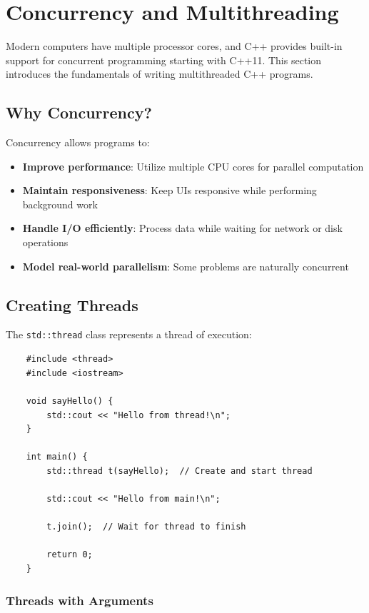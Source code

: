 \section{Concurrency and Multithreading}

Modern computers have multiple processor cores, and C++ provides built-in support for concurrent programming starting with C++11. This section introduces the fundamentals of writing multithreaded C++ programs.

\subsection{Why Concurrency?}

Concurrency allows programs to:
\begin{itemize}
	\item \textbf{Improve performance}: Utilize multiple CPU cores for parallel computation
	\item \textbf{Maintain responsiveness}: Keep UIs responsive while performing background work
	\item \textbf{Handle I/O efficiently}: Process data while waiting for network or disk operations
	\item \textbf{Model real-world parallelism}: Some problems are naturally concurrent
\end{itemize}

\subsection{Creating Threads}

The \texttt{std::thread} class represents a thread of execution:

\begin{lstlisting}
	#include <thread>
	#include <iostream>
	
	void sayHello() {
		std::cout << "Hello from thread!\n";
	}
	
	int main() {
		std::thread t(sayHello);  // Create and start thread
		
		std::cout << "Hello from main!\n";
		
		t.join();  // Wait for thread to finish
		
		return 0;
	}
\end{lstlisting}

\subsubsection{Threads with Arguments}

